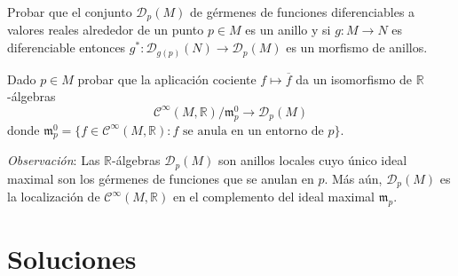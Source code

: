 \documentclass[11pt]{article}
\newcommand{\R}{{\mathbb{R}}}
\numberwithin{theorem}{subsection}
\begin{document}
\begin{question}
	Probar que el conjunto $\mathscr{D}_p(M)$ de g\'ermenes de funciones diferenciables a valores reales alrededor de un punto $p\in M$ es un anillo y si $g:M\to N$ es diferenciable entonces $g^*:\mathscr{D}_{g(p)}(N)\to\mathscr{D}_p(M)$ es un morfismo de anillos.
\end{question}

\begin{question}
	Dado $p\in M$ probar que la aplicaci\'on cociente $f\mapsto\overline{f}$ da un isomorfismo de $\R$-\'algebras $$\mathscr{C}^\infty(M,\R)/\mathfrak{m}_p^0\to\mathscr{D}_p(M)$$ donde $\mathfrak{m}_p^0 = \{f\in\mathscr{C}^\infty(M,\R): f \text{ se anula en un entorno de } p\}$.
	\vspace{1em}
	
	\noindent\textit{Observaci\'on}: Las $\R$-\'algebras $\mathscr{D}_p(M)$ son anillos locales cuyo \'unico ideal maximal son los g\'ermenes de funciones que se anulan en $p$. M\'as a\'un, $\mathscr{D}_p(M)$ es la localizaci\'on de $\mathscr{C}^\infty(M,\R)$ en el complemento del ideal maximal $\mathfrak{m}_p$.
\end{question}

\section{Soluciones}

\printsolutions
\end{document}

